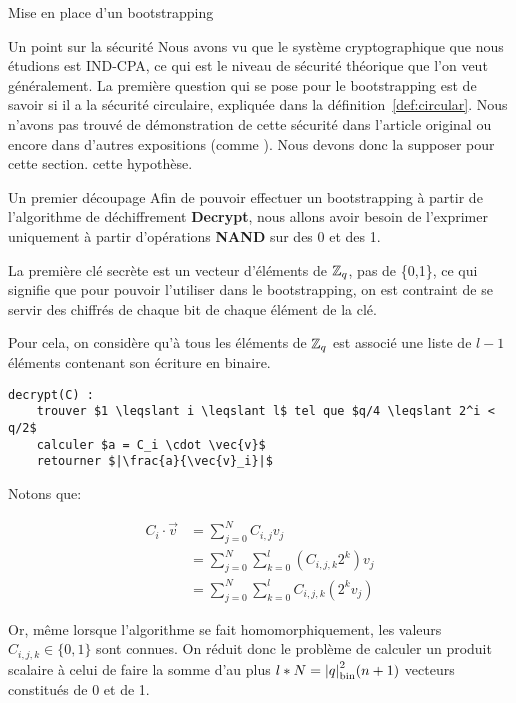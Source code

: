 \begin{section}{Mise en place d'un bootstrapping}
\begin{subsection}{Un point sur la sécurité}
	Nous avons vu que le système cryptographique que nous étudions est IND-CPA, ce qui est le niveau de sécurité
	théorique que l'on veut généralement. La première question qui se pose pour le bootstrapping est de savoir si
	il a la sécurité circulaire, expliquée dans la définition~\ref{def:circular}.
	Nous n'avons pas trouvé de démonstration de cette sécurité dans l'article original \cite{EPRINT:GenSahWat13} 
	ou encore dans d'autres expositions (comme \cite{halevi}). Nous devons donc la supposer pour cette section.
	cette hypothèse.
\end{subsection}
\begin{subsection}{Un premier découpage}
	Afin de pouvoir effectuer un bootstrapping à partir de l'algorithme de déchiffrement \textbf{Decrypt}, nous allons avoir besoin de l'exprimer uniquement à partir d'opérations \textbf{NAND} sur des 0 et des 1.
	
	La première clé secrète est un vecteur d'éléments de $\mathbb{Z}_q$, pas de \{0,1\}, ce qui signifie que pour pouvoir l'utiliser dans le bootstrapping, on est contraint de se servir des chiffrés de chaque bit de chaque élément de la clé.

	Pour cela, on considère qu'à tous les éléments de $\mathbb{Z}_q$ est associé une liste de $l-1$ éléments contenant son écriture en binaire.

\begin{lstlisting}
decrypt(C) :
	trouver $1 \leqslant i \leqslant l$ tel que $q/4 \leqslant 2^i < q/2$
	calculer $a = C_i \cdot \vec{v}$
	retourner $|\frac{a}{\vec{v}_i}|$
\end{lstlisting}

Notons que:

\begin{align*}
	C_i \cdot \vec{v} &= \sum_{j=0}^N C_{i,j} v_j \\
	&= \sum_{j=0}^N \sum_{k=0}^l \left( C_{i,j,k} 2^k \right) v_j \\
	&= \sum_{j=0}^N \sum_{k=0}^l C_{i,j,k} (2^k v_j)
\end{align*}

	Or, même lorsque l'algorithme se fait homomorphiquement, les valeurs
	$C_{i,j,k} \in \{ 0,1 \}$ sont connues. On réduit donc le problème de
	calculer un produit scalaire à celui de faire la somme d'au plus $l * N
	= {|q|}_{\text{bin}}^2 (n+1)$ vecteurs constitués de 0 et de 1.


\end{subsection}
\end{section}
